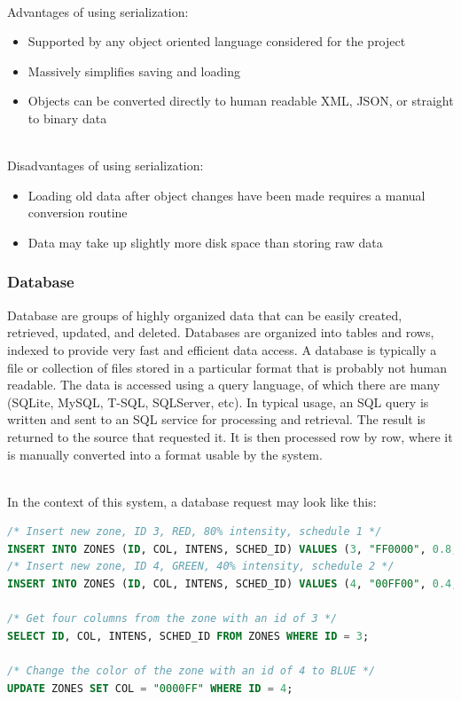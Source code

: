 		\noindent \\Advantages of using serialization:
		\begin{itemize}
			\item Supported by any object oriented language considered for the project
			\item Massively simplifies saving and loading
			\item Objects can be converted directly to human readable XML, JSON, or straight to binary data
		\end{itemize}

		\noindent \\Disadvantages of using serialization:
		\begin{itemize}
			\item Loading old data after object changes have been made requires a manual conversion routine
			\item Data may take up slightly more disk space than storing raw data
		\end{itemize}


		\subsubsection{Database}
		Database are groups of highly organized data that can be easily created, retrieved, updated, and deleted. \cite{database1}
		Databases are organized into tables and rows, indexed to provide very fast and efficient data access.
		A database is typically a file or collection of files stored in a particular format that is probably not human readable.
		The data is accessed using a query language, of which there are many (SQLite, MySQL, T-SQL, SQLServer, etc).
		In typical usage, an SQL query is written and sent to an SQL service for processing and retrieval.
		The result is returned to the source that requested it.
		It is then processed row by row, where it is manually converted into a format usable by the system.

		\noindent \\In the context of this system, a database request may look like this:
		\begin{lstlisting}[language=SQL]
/* Insert new zone, ID 3, RED, 80% intensity, schedule 1 */
INSERT INTO ZONES (ID, COL, INTENS, SCHED_ID) VALUES (3, "FF0000", 0.8, 1);
/* Insert new zone, ID 4, GREEN, 40% intensity, schedule 2 */
INSERT INTO ZONES (ID, COL, INTENS, SCHED_ID) VALUES (4, "00FF00", 0.4, 2);

/* Get four columns from the zone with an id of 3 */
SELECT ID, COL, INTENS, SCHED_ID FROM ZONES WHERE ID = 3;

/* Change the color of the zone with an id of 4 to BLUE */
UPDATE ZONES SET COL = "0000FF" WHERE ID = 4;
\end{lstlisting}


